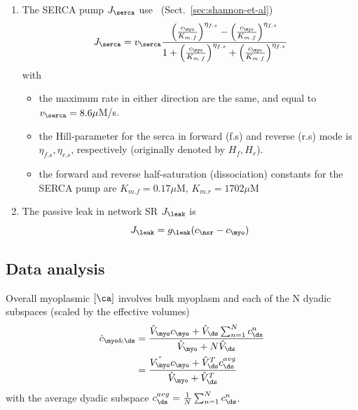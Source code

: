 \begin{enumerate}
\item The SERCA pump $J_\serca$ use~\citep{shannon2000rms}
  (Sect.~\ref{sec:shannon-et-al})
  \begin{equation}
    \label{eq:1022}
    J_\serca = v_\serca
    \frac{\left(\frac{c_\myo}{K_{m.f}}\right)^{\eta_{f.s}}-
      \left(\frac{c_\myo}{K_{m.f}}\right)^{\eta_{f.s}}}{1+\left(\frac{c_\myo}{K_{m.f}}\right)^{\eta_{f.s}}+
      \left(\frac{c_\myo}{K_{m.f}}\right)^{\eta_{f.s}}}
  \end{equation}
  with 
  \begin{itemize}
  \item the maximum rate in either direction are the same, and equal to
    $v_\serca=8.6\mu$M/s. 

  \item the Hill-parameter for the serca in forward (f.s) and reverse
    (r.s) mode is $\eta_{f.s},\eta_{r.s}$, respectively (originally
    denoted by $H_f, H_r$).

  \item the forward and reverse half-saturation (dissociation) constants
    for the SERCA pump are $K_{m.f}=0.17\mu$M, $K_{m.r}=1702\mu$M
  \end{itemize}


\item The passive leak in network SR $J_\leak$ is
  \begin{equation}
    \label{eq:1023}
    J_\leak = g_\leak(c_\nsr-c_\myo)
  \end{equation}
\end{enumerate}


\subsection{Data analysis}
\label{sec:data-analysis-4}

Overall myoplasmic $[\ca]$ involves bulk myoplasm and each of the N
dyadic subspaces (scaled by the effective volumes)
\begin{equation}
  \label{eq:1013}
  \begin{split}
    \hat{c}_{\myo\&\ds} &= \frac{\hat{V}_\myo c_\myo+\hat{V}_\ds
      \sum^N_{n=1} c^n_\ds}{\hat{V}_\myo+N \hat{V}_\ds} \\
    &= \frac{\hat{V_\myo} c_\myo+\hat{V}^T_\ds
      c^{avg}_\ds}{\hat{V}_\myo+\hat{V}^T_\ds} 
  \end{split}
\end{equation}
with the average dyadic subspace
$c^{avg}_\ds=\frac{1}{N}\sum^N_{n=1}c^n_\ds$. 

